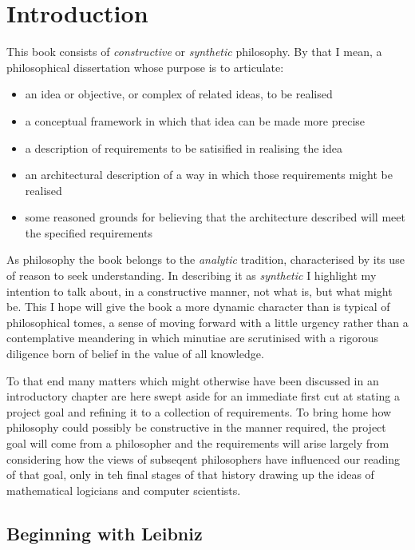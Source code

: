 
\chapter{Introduction}\label{IntroductionA}

This book consists of {\it constructive} or {\it synthetic} philosophy.
By that I mean, a philosophical dissertation whose purpose is to articulate:

\begin{itemize}
\item an idea or objective, or complex of related ideas, to be realised
\item a conceptual framework in which that idea can be made more precise
\item a description of requirements to be satisified in realising the idea
\item an architectural description of a way in which those requirements might be realised
\item some reasoned grounds for believing that the architecture described will meet the specified requirements
\end{itemize}

As philosophy the book belongs to the {\it analytic} tradition, characterised by its use of reason to seek understanding.
In describing it as {\it synthetic} I highlight my intention to talk about, in a constructive manner, not what is, but what might be.
This I hope will give the book a more dynamic character than is typical of philosophical tomes, a sense of moving forward with a little urgency rather than a contemplative meandering in which minutiae are scrutinised with a rigorous diligence born of belief in the value of all knowledge.

To that end many matters which might otherwise have been discussed in an introductory chapter are here swept aside for an immediate first cut at stating a project goal and refining it to a collection of requirements.
To bring home how philosophy could possibly be constructive in the manner required, the project goal will come from a philosopher and the requirements will arise largely from considering how the views of subseqent philosophers have influenced our reading of that goal, only in teh final stages of that history drawing up the ideas of mathematical logicians and computer scientists.

\section{Beginning with Leibniz}

